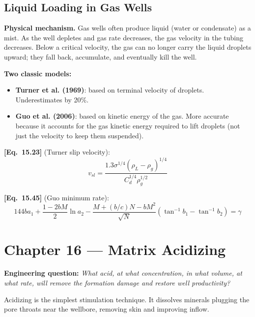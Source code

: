 \documentclass[11pt,a4paper,openany]{book}
\newcommand{\eqrefbook}[1]{\textcolor{blue!60!black}{\textbf{[Eq.~#1]}}}
\begin{document}
\section{Liquid Loading in Gas Wells}

\begin{theory}
\textbf{Physical mechanism.} Gas wells often produce liquid (water or
condensate) as a mist. As the well depletes and gas rate decreases,
the gas velocity in the tubing decreases. Below a critical velocity,
the gas can no longer carry the liquid droplets upward; they fall
back, accumulate, and eventually kill the well.

\textbf{Two classic models:}
\begin{itemize}
  \item \textbf{Turner et al. (1969)}: based on terminal velocity of
        droplets. Underestimates by 20\%.
  \item \textbf{Guo et al. (2006)}: based on kinetic energy of the
        gas. More accurate because it accounts for the gas kinetic
        energy required to lift droplets (not just the velocity to
        keep them suspended).
\end{itemize}
\end{theory}

\eqrefbook{15.23} (Turner slip velocity):
\begin{equation}
  v_{sl} = \frac{1.3\sigma^{1/4}(\rho_L - \rho_g)^{1/4}}
  {C_d^{1/4}\rho_g^{1/2}}
\end{equation}

\eqrefbook{15.45} (Guo minimum rate):
\begin{equation}
  144ba_1 + \frac{1-2bM}{2}\ln a_2
  - \frac{M + (b/c)N - bM^2}{\sqrt{N}}
  (\tan^{-1}b_1 - \tan^{-1}b_2) = \gamma
\end{equation}

\chapter{Chapter 16 — Matrix Acidizing}

\begin{purpose}
\textbf{Engineering question:} \emph{What acid, at what concentration,
in what volume, at what rate, will remove the formation damage and
restore well productivity?}

Acidizing is the simplest stimulation technique. It dissolves minerals
plugging the pore throats near the wellbore, removing skin and
improving inflow.
\end{purpose}
\end{document}
